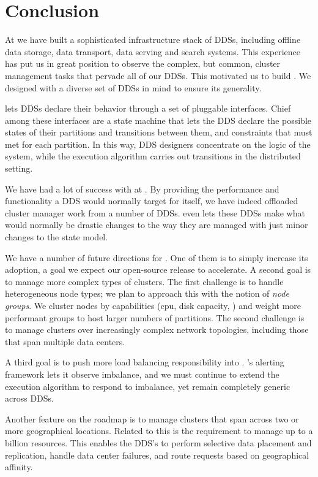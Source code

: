 \section{Conclusion}
\label{sec:conclusion}
%
At \linkedin we have built a sophisticated infrastructure stack of DDSs, including
offline data storage, data transport, data serving and search systems.  This
experience has put us in great position to observe the complex, but common,
cluster management tasks that pervade all of our DDSs.  This motivated us to
build \helix.  We designed \helix with a diverse set of DDSs in mind to ensure
its generality.

\helix lets DDSs declare their behavior through a set of pluggable interfaces.
Chief among these interfaces are a state machine that lets the DDS declare the
possible states of their partitions and transitions between them, and constraints 
that must met for each partition.  In this way, DDS designers concentrate on
the logic of the system, while the \helix execution algorithm carries out transitions in the distributed
setting.  

We have had a lot of success with \helix at \linkedin.  By providing the
performance and functionality a DDS would normally target for itself, we have indeed
offloaded cluster manager work from a number of DDSs.  \helix even lets these DDSs
make what would normally be drastic changes to the way they are managed with
just minor changes to the \helix state model.    

We have a number of future directions for \helix.  One of them is to simply
increase its adoption, a goal we expect our open-source release to accelerate.
A second goal is to manage more complex types of clusters.  The first challenge
is to handle heterogeneous node types; we plan to approach this with the notion
of \emph{node groups}.  We cluster nodes by capabilities (cpu, disk capacity,
\etc) and weight more performant groups to host larger numbers of partitions. 
The second challenge is to manage clusters over increasingly complex network
topologies, including those that span multiple data centers.  

A third goal is to push more load balancing responsibility into \helix.  \helix's
alerting framework lets it observe imbalance, and we must continue to extend the
\helix execution algorithm to respond to imbalance, yet remain completely
generic across DDSs. 

Another feature on the roadmap is to manage clusters that span across two or
more geographical locations. Related to this is the requirement to manage up to a billion resources.
This enables the DDS's to perform selective data placement and replication, handle data center failures, 
and route requests based on geographical affinity.

